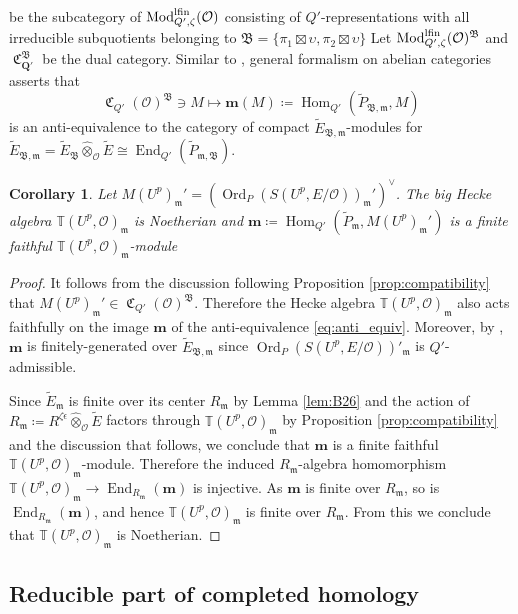 \documentclass[leqno]{amsart}
\newtheorem{cor}[thm]{Corollary}
\theoremstyle{definition}
\theoremstyle{remark}
\newcommand{\oo}{\mathcal{O}}
\newcommand{\Q}{{\mathbf{Q}}}
\DeclareMathOperator{\End}{End}
\DeclareMathOperator{\Hom}{Hom}
\newcommand{\fm}{\mathfrak{m}}
\DeclareMathOperator{\Mod}{\textnormal{Mod}}
\DeclareMathOperator{\fC}{\mathfrak{C}} %
\DeclareMathOperator{\Ord}{Ord} %
\newcommand{\B}{\mathfrak B} %
\newcommand{\lfin}{\textnormal{lfin}}
\newcommand{\TT}{\mathbb{T}} %
\begin{document}
be the subcategory of $\Mod^{\lfin}_{Q',\zeta}(\oo)$
consisting of $Q'$-representations
with all irreducible subquotients
belonging to
$\B=\{\pi_1\boxtimes\upsilon, \pi_2\boxtimes\upsilon\}$
Let $\Mod^{\lfin}_{Q',\zeta}(\oo)^\B$
and $\fC_{\Q'}^\B$ be the dual category.
Similar to \cite[Prop.5.45]{pask},
general formalism on abelian categories 
asserts that 
\begin{equation}\label{eq:anti_equiv}
        \fC_{Q'}(\oo)^{\B}\ni M  \mapsto 
        \mathbf{m}(M)\coloneqq 
        \Hom_{Q'}(\tilde{P}_{\B,\fm}, M)
\end{equation}
is an anti-equivalence to the category 
of compact $\tilde{E}_{\B,\fm}$-modules for
$\tilde{E}_{\B,\fm}
=\tilde{E}_\B\hat{\otimes}_{\oo}\tilde{E}\cong \End_{Q'}(\tilde{P}_{\fm,\B})$.

\begin{cor}\label{cor:Hecke_Noetherian}
    Let $M(U^p)_\fm'=(\Ord_P(S(U^p,E/\oo))_\fm')^\vee$.
	The big Hecke algebra
	$\TT(U^p,\oo)_{\fm}$ is Noetherian and
	$\mathbf{m}\coloneqq
	\Hom_{Q'}(\tilde{P}_{\fm},M(U^p)_{\fm}')$
	is a finite faithful $\TT(U^p,\oo)_{\fm}$-module
\end{cor}
\begin{proof}
    It follows from the discussion following 
    Proposition \ref{prop:compatibility}
    that $M(U^p)_\fm'\in \fC_{Q'}(\oo)^\B$.
    Therefore the Hecke algebra
    $\TT(U^p,\oo)_\fm$ also acts faithfully
    on the image $\mathbf{m}$
    of the anti-equivalence \eqref{eq:anti_equiv}.
	Moreover,  by \cite[Prop 4.17]{pask},
    $\mathbf{m}$ is finitely-generated
	over $\tilde{E}_{\B,\fm}$ since 
    $\Ord_P(S(U^p,E/\oo))'_{\fm}$ is $Q'$-admissible.
    
	Since $\tilde{E}_{\fm}$ is finite over
    its center $R_{\fm}$ by Lemma \ref{lem:B26}
    and the action of 
    $R_{\fm}\coloneqq R^{\zeta\epsilon}\hat{\otimes}_\oo
    \tilde{E}$ factors through 
    $\TT(U^p,\oo)_\fm$ by Proposition
    \ref{prop:compatibility} and the discussion that 
    follows,
	we conclude that $\mathbf{m}$ 
	is a finite faithful $\TT(U^p,\oo)_{\fm}$-module.
    Therefore the induced $R_\fm$-algebra  homomorphism 
	$\TT(U^p,\oo)_{\fm}\to 
	\End_{R_{\fm}}(\mathbf{m})$ is injective.
    As $\mathbf{m}$ is finite over $R_\fm$,
    so is $\End_{R_\fm}(\mathbf{m})$,
    and hence $\TT(U^p,\oo)_\fm$
	is finite over $R_{\fm}$.
    From this we conclude that 
    $\TT(U^p,\oo)_\fm$ is Noetherian.
\end{proof}


\subsection{Reducible part of completed homology}
\end{document}
